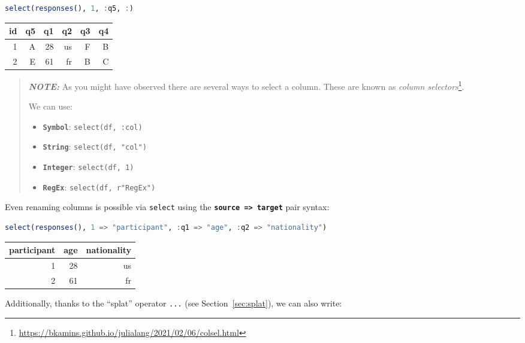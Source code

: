 \documentclass[
  notoc %
]{tufte-book}
\DeclareRobustCommand{\href}[2]{#2\footnote{\url{#1}}}
\providecommand{\tightlist}{%
  \setlength{\itemsep}{0pt}\setlength{\parskip}{0pt}
}
\newcommand{\passthrough}[1]{#1}
\begin{document}
\begin{lstlisting}[language=Julia]
select(responses(), 1, :q5, :)
\end{lstlisting}

\begin{longtable}[]{@{}rrrrrr@{}}
\toprule()
id & q5 & q1 & q2 & q3 & q4 \\
\midrule()
\endhead
1 & A & 28 & us & F & B \\
2 & E & 61 & fr & B & C \\
\bottomrule()
\end{longtable}

\begin{quote}
\textbf{\emph{NOTE:}} As you might have observed there are several ways
to select a column. These are known as
\href{https://bkamins.github.io/julialang/2021/02/06/colsel.html}{\emph{column
selectors}}.

We can use:

\begin{itemize}
\tightlist
\item
  \textbf{\passthrough{\lstinline!Symbol!}}:
  \passthrough{\lstinline!select(df, :col)!}
\item
  \textbf{\passthrough{\lstinline!String!}}:
  \passthrough{\lstinline!select(df, "col")!}
\item
  \textbf{\passthrough{\lstinline!Integer!}}:
  \passthrough{\lstinline!select(df, 1)!}
\item
  \textbf{\passthrough{\lstinline!RegEx!}}:
  \passthrough{\lstinline!select(df, r"RegEx")!}
\end{itemize}
\end{quote}

Even renaming columns is possible via \passthrough{\lstinline!select!}
using the \textbf{\passthrough{\lstinline!source => target!}} pair
syntax:

\begin{lstlisting}[language=Julia]
select(responses(), 1 => "participant", :q1 => "age", :q2 => "nationality")
\end{lstlisting}

\begin{longtable}[]{@{}rrr@{}}
\toprule()
participant & age & nationality \\
\midrule()
\endhead
1 & 28 & us \\
2 & 61 & fr \\
\bottomrule()
\end{longtable}

Additionally, thanks to the ``splat'' operator
\passthrough{\lstinline!...!} (see Section~\ref{sec:splat}), we can also
write:
\end{document}
